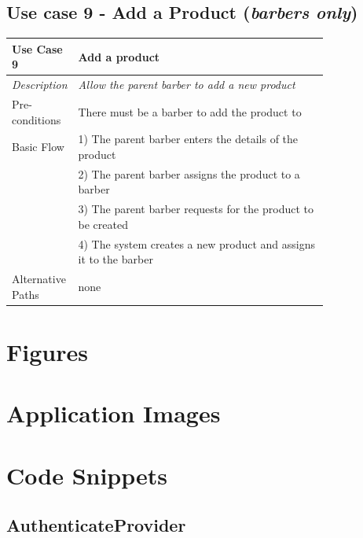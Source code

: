 \documentclass[12pt]{article}
\begin{document}
	\subsection{Use case 9 - Add a Product (\emph{barbers only})}
	\label{chap:use-cases-9}
	\begin{table}[H]
		\begin{tabular}{|l|p{0.8\linewidth}}
			\hline
			\rowcolor[HTML]{EFEFEF} 
			\textbf{Use Case 9}  & \textbf{Add a product}                                           \\ \hline
			\rowcolor[HTML]{F5FBFF} 
			\textit{Description} & \textit{Allow the parent barber to add a new product}            \\ \hline
			\rowcolor[HTML]{EFEFEF} 
			Pre-conditions       & There must be a barber to add the product to                     \\ \hline
			\rowcolor[HTML]{F5FBFF} 
			Basic Flow           & 1) The parent barber enters the details of the product           \\
			\rowcolor[HTML]{F5FBFF} 
			& 2) The parent barber assigns the product to a barber             \\
			\rowcolor[HTML]{F5FBFF} 
			& 3) The parent barber requests for the product to be created      \\
			\rowcolor[HTML]{F5FBFF} 
			& 4) The system creates a new product and assigns it to the barber \\ \hline
			\rowcolor[HTML]{EFEFEF} 
			Alternative Paths    & none                                                            
		\end{tabular}
	\end{table}
	

	\section{Figures}
	
	\section{Application Images}
	\section{Code Snippets}
	\subsection{AuthenticateProvider}
	
\end{document}
